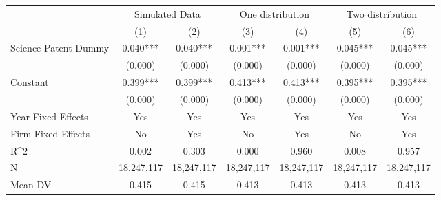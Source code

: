 {
\def\sym#1{\ifmmode^{#1}\else\(^{#1}\)\fi}
\begin{tabular}{l*{6}{c}}
\hline\hline
                    &\multicolumn{2}{c}{Simulated Data}&\multicolumn{2}{c}{One distribution}&\multicolumn{2}{c}{Two distribution}\\\cmidrule(lr){2-3}\cmidrule(lr){4-5}\cmidrule(lr){6-7}
                    &\multicolumn{1}{c}{(1)}   &\multicolumn{1}{c}{(2)}   &\multicolumn{1}{c}{(3)}   &\multicolumn{1}{c}{(4)}   &\multicolumn{1}{c}{(5)}   &\multicolumn{1}{c}{(6)}   \\
\hline
Science Patent Dummy&       0.040***&       0.040***&       0.001***&       0.001***&       0.045***&       0.045***\\
                    &     (0.000)   &     (0.000)   &     (0.000)   &     (0.000)   &     (0.000)   &     (0.000)   \\
Constant            &       0.399***&       0.399***&       0.413***&       0.413***&       0.395***&       0.395***\\
                    &     (0.000)   &     (0.000)   &     (0.000)   &     (0.000)   &     (0.000)   &     (0.000)   \\
\hline
Year Fixed Effects  &         Yes   &         Yes   &         Yes   &         Yes   &         Yes   &         Yes   \\
Firm Fixed Effects  &          No   &         Yes   &          No   &         Yes   &          No   &         Yes   \\
R^2                 &       0.002   &       0.303   &       0.000   &       0.960   &       0.008   &       0.957   \\
N                   &  18,247,117   &  18,247,117   &  18,247,117   &  18,247,117   &  18,247,117   &  18,247,117   \\
Mean DV             &       0.415   &       0.415   &       0.413   &       0.413   &       0.413   &       0.413   \\
\hline\hline
\end{tabular}
}
